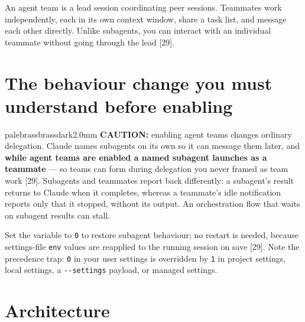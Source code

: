 \documentclass[11pt,a4paper,twoside,openany]{book}
\begin{document}
An agent team is a lead session coordinating peer sessions. Teammates work independently, each in its own context window, share a task list, and message each other directly. Unlike subagents, you can interact with an individual teammate without going through the lead [29].


\FloatBarrier
\setcounter{section}{0}
\section{The behaviour change you must understand before enabling}

\begin{calloutbox}{palebrass}{brassdark}{2.0mm}
\textbf{CAUTION:} enabling agent teams changes ordinary delegation. Claude names subagents on its own so it can message them later, and \textbf{while agent teams are enabled a named subagent launches as a teammate} — so teams can form during delegation you never framed as team work [29]. Subagents and teammates report back differently: a subagent's result returns to Claude when it completes, whereas a teammate's idle notification reports only that it stopped, without its output. An orchestration flow that waits on subagent results can stall.
\end{calloutbox}

Set the variable to \texttt{0} to restore subagent behaviour; no restart is needed, because settings-file \texttt{env} values are reapplied to the running session on save [29]. Note the precedence trap: \texttt{0} in your user settings is overridden by \texttt{1} in project settings, local settings, a \texttt{-\allowbreak{}-\allowbreak{}settings} payload, or managed settings.


\FloatBarrier
\setcounter{section}{1}
\section{Architecture}
\end{document}
